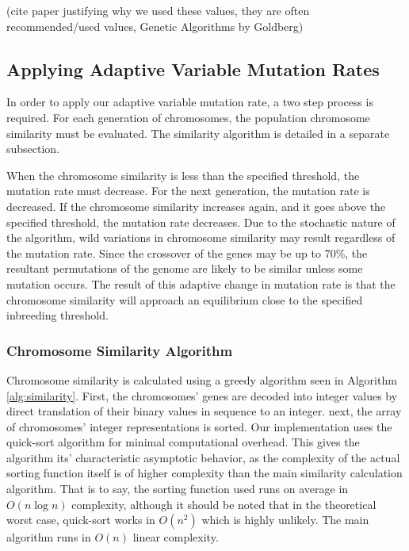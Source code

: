 \documentclass{sig-alternate}
\begin{document}
(cite paper justifying why we used these values, they are often recommended/used values, Genetic Algorithms by Goldberg)


\subsection{Applying Adaptive Variable Mutation Rates}
In order to apply our adaptive variable mutation rate, a two step process is required. For each generation of chromosomes, the population chromosome similarity must be evaluated. The similarity algorithm is detailed in a separate subsection.  

When the chromosome similarity is less than the specified threshold, the mutation rate must decrease. For the next generation, the mutation rate is decreased. If the chromosome similarity increases again, and it goes above the specified threshold, the mutation rate decreases. Due to the stochastic nature of the algorithm, wild variations in chromosome similarity may result regardless of the mutation rate. Since the crossover of the genes may be up to 70\%, the resultant permutations of the genome are likely to be similar unless some mutation occurs. The result of this adaptive change in mutation rate is that the chromosome similarity will approach an equilibrium close to the specified inbreeding threshold.

\subsubsection{Chromosome Similarity Algorithm}
Chromosome similarity is calculated using a greedy algorithm seen in Algorithm \ref{alg:similarity}. First, the chromosomes' genes are decoded into integer values by direct translation of their binary values in sequence to an integer. next, the array of chromosomes' integer representations is sorted. Our implementation uses the quick-sort algorithm for minimal computational overhead. This gives the algorithm its' characteristic asymptotic behavior, as the complexity of the actual sorting function itself is of higher complexity than the main similarity calculation algorithm. That is to say, the sorting function used runs on average in $O(n \log n)$ complexity, although it should be noted that in the theoretical worst case, quick-sort works in $O(n^2)$ which is highly unlikely. The main algorithm runs in $O(n)$ linear complexity.
\end{document}
